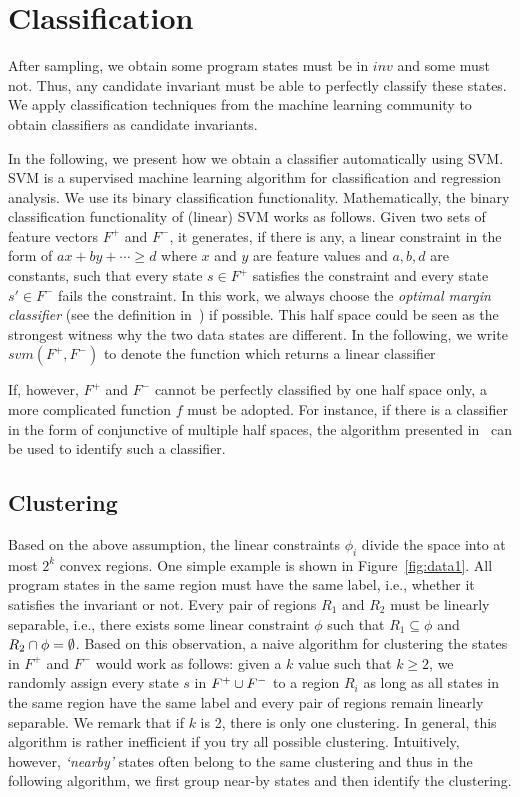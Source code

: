 
\section{Classification}
After sampling, we obtain some program states must be in $inv$ and some must not. Thus, any candidate invariant must be able to perfectly classify these states. We apply classification techniques from the machine learning community to obtain classifiers as candidate invariants.

In the following, we present how we obtain a classifier automatically using SVM. SVM is a supervised machine learning algorithm for classification and regression analysis. We use its binary classification functionality. Mathematically, the binary classification functionality of (linear) SVM works as follows. Given two sets of feature vectors $F^+$ and $F^-$, it generates, if there is any, a linear constraint in the form of $ax + by + \cdots \geq d$ where $x$ and $y$ are feature values and $a, b, d$ are constants, such that every state $s \in F^+$ satisfies the constraint and every state $s' \in F^-$ fails the constraint. In this work, we always choose the \textit{optimal margin classifier} (see the definition in~\cite{Sharma2012}) if possible. This half space could be seen as the strongest witness why the two data states are different. In the following, we write $svm(F^+, F^-)$ to denote the function which returns a linear classifier

If, however, $F^+$ and $F^-$ cannot be perfectly classified by one half space only, a more complicated function $f$ must be adopted. For instance, if there is a classifier in the form of conjunctive of multiple half spaces, the algorithm presented in~\cite{Sharma2012} can be used to identify such a classifier.

\subsection{Clustering}
Based on the above assumption, the linear constraints $\phi_i$ divide the space into at most $2^k$ convex regions. One simple example is shown in Figure~\ref{fig:data1}. All program states in the same region must have the same label, i.e., whether it satisfies the invariant or not. Every pair of regions $R_1$ and $R_2$ must be linearly separable, i.e., there exists some linear constraint $\phi$ such that $R_1 \subseteq \phi$ and $R_2 \cap \phi = \emptyset$. Based on this observation, a naive algorithm for clustering the states in $F^+$ and $F^-$ would work as follows: given a $k$ value such that $k \geq 2$, we randomly assign every state $s$ in $F^+ \cup F^-$ to a region $R_i$ as long as all states in the same region have the same label and every pair of regions remain linearly separable. We remark that if $k$ is 2, there is only one clustering. In general, this algorithm is rather inefficient if you try all possible clustering. Intuitively, however, \emph{`nearby'} states often belong to the same clustering and thus in the following algorithm, we first group near-by states and then identify the clustering.

